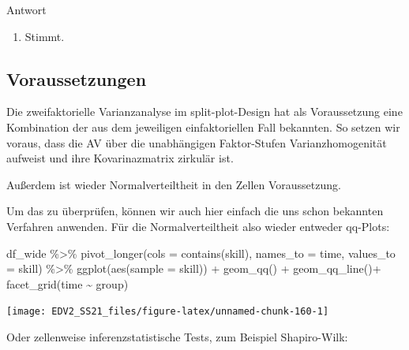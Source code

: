 \documentclass[
]{book}
\newenvironment{Shaded}{\begin{snugshade}}{\end{snugshade}}
\newcommand{\AttributeTok}[1]{\textcolor[rgb]{0.77,0.63,0.00}{#1}}
\newcommand{\FunctionTok}[1]{\textcolor[rgb]{0.00,0.00,0.00}{#1}}
\newcommand{\NormalTok}[1]{#1}
\newcommand{\SpecialCharTok}[1]{\textcolor[rgb]{0.00,0.00,0.00}{#1}}
\newcommand{\StringTok}[1]{\textcolor[rgb]{0.31,0.60,0.02}{#1}}
\providecommand{\tightlist}{%
  \setlength{\itemsep}{0pt}\setlength{\parskip}{0pt}}
\begin{document}
Antwort

\begin{enumerate}
\def\labelenumi{\arabic{enumi}.}
\tightlist
\item
  Stimmt.
\end{enumerate}

\hypertarget{voraussetzungen-2}{%
\subsection{Voraussetzungen}\label{voraussetzungen-2}}

Die zweifaktorielle Varianzanalyse im split-plot-Design hat als Voraussetzung eine Kombination der aus dem jeweiligen einfaktoriellen Fall bekannten. So setzen wir voraus, dass die AV über die unabhängigen Faktor-Stufen Varianzhomogenität aufweist und ihre Kovarinazmatrix zirkulär ist.

Außerdem ist wieder Normalverteiltheit in den Zellen Voraussetzung.

Um das zu überprüfen, können wir auch hier einfach die uns schon bekannten Verfahren anwenden. Für die Normalverteiltheit also wieder entweder qq-Plots:

\begin{Shaded}
\begin{Highlighting}[]
\NormalTok{df\_wide }\SpecialCharTok{\%\textgreater{}\%} 
  \FunctionTok{pivot\_longer}\NormalTok{(}\AttributeTok{cols =} \FunctionTok{contains}\NormalTok{(}\StringTok{\textquotesingle{}skill\textquotesingle{}}\NormalTok{),}
               \AttributeTok{names\_to =} \StringTok{\textquotesingle{}time\textquotesingle{}}\NormalTok{,}
               \AttributeTok{values\_to =} \StringTok{\textquotesingle{}skill\textquotesingle{}}\NormalTok{) }\SpecialCharTok{\%\textgreater{}\%} 
  \FunctionTok{ggplot}\NormalTok{(}\FunctionTok{aes}\NormalTok{(}\AttributeTok{sample =}\NormalTok{ skill)) }\SpecialCharTok{+}
  \FunctionTok{geom\_qq}\NormalTok{() }\SpecialCharTok{+}
  \FunctionTok{geom\_qq\_line}\NormalTok{()}\SpecialCharTok{+}
  \FunctionTok{facet\_grid}\NormalTok{(time }\SpecialCharTok{\textasciitilde{}}\NormalTok{ group) }
\end{Highlighting}
\end{Shaded}

\begin{center}\texttt{[image: EDV2\_SS21\_files/figure-latex/unnamed-chunk-160-1]} \end{center}

Oder zellenweise inferenzstatistische Tests, zum Beispiel Shapiro-Wilk:
\end{document}
